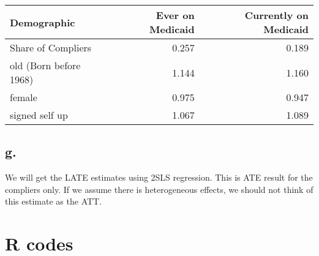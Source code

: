 \documentclass[
  letterpaper,
  DIV=11,
  numbers=noendperiod]{scrartcl}
\begin{document}
\begin{table}[!h]
\centering
\begin{tabular}[t]{lrr}
\toprule
Demographic & Ever on Medicaid & Currently on Medicaid\\
\midrule
Share of Compliers & 0.257 & 0.189\\
old (Born before 1968) & 1.144 & 1.160\\
female & 0.975 & 0.947\\
signed self up & 1.067 & 1.089\\
\bottomrule
\end{tabular}
\end{table}

\subsection{g.}\label{g.}

We will get the LATE estimates using 2SLS regression. This is ATE result
for the compliers only. If we assume there is heterogeneous effects, we
should not think of this estimate as the ATT.

\begin{table}[!h]
\end{table}

\section{R codes}\label{r-codes}
\end{document}
